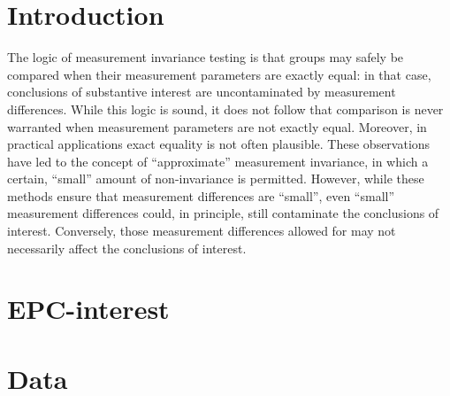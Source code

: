 \documentclass[letterpaper,12pt]{article}
\begin{document}
\section{Introduction}

\noindent

The logic of measurement invariance testing is that groups may safely be compared when their measurement parameters are exactly equal: in that case, conclusions of substantive interest are uncontaminated by measurement differences. While this logic is sound, it does not follow that comparison is never warranted when measurement parameters are not exactly equal. Moreover, in practical applications exact equality is not often plausible. These observations have led to the concept of ``approximate'' measurement  invariance, in which a certain, ``small'' amount of non-invariance is permitted. 
However, while these methods ensure that measurement differences are ``small'', even ``small'' measurement differences could, in principle, still contaminate the conclusions of interest. Conversely, those measurement differences allowed for may not necessarily affect the conclusions of interest. 


\citep{muthen2012bayesian}
\citep{schoot2013facing}

\citep{muthen2014alignment}


\section{EPC-interest}



\section{Data}
\end{document}
